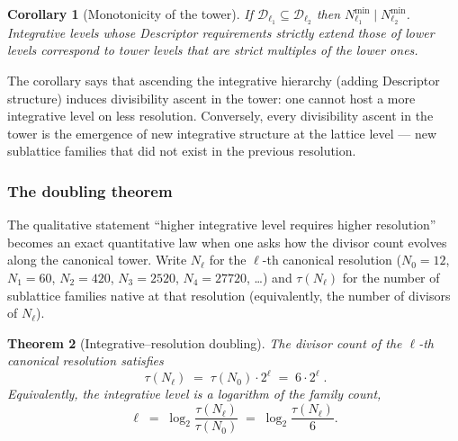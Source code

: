 \documentclass[11pt,a4paper]{article}
\newtheorem{theorem}{Theorem}[section]
\newtheorem{corollary}[theorem]{Corollary}
\theoremstyle{definition}
\theoremstyle{remark}
\begin{document}
\begin{corollary}[Monotonicity of the tower]\label{cor:int-monotone}
If $\mathcal{D}_{\ell_{1}}\subseteq\mathcal{D}_{\ell_{2}}$ then $N_{\ell_{1}}^{\min}\mid N_{\ell_{2}}^{\min}$. Integrative levels whose Descriptor requirements strictly extend those of lower levels correspond to tower levels that are strict multiples of the lower ones.
\end{corollary}

The corollary says that ascending the integrative hierarchy (adding Descriptor structure) induces divisibility ascent in the tower: one cannot host a more integrative level on less resolution. Conversely, every divisibility ascent in the tower is the emergence of new integrative structure at the lattice level --- new sublattice families that did not exist in the previous resolution.

\subsubsection*{The doubling theorem}

The qualitative statement ``higher integrative level requires higher resolution'' becomes an exact quantitative law when one asks how the divisor count evolves along the canonical tower. Write $N_{\ell}$ for the $\ell$-th canonical resolution ($N_{0}=12$, $N_{1}=60$, $N_{2}=420$, $N_{3}=2520$, $N_{4}=27720$, \ldots) and $\tau(N_{\ell})$ for the number of sublattice families native at that resolution (equivalently, the number of divisors of $N_{\ell}$).

\begin{theorem}[Integrative--resolution doubling]\label{thm:doubling}
The divisor count of the $\ell$-th canonical resolution satisfies
\begin{equation}\label{eq:doubling}
\boxed{\;\tau(N_{\ell}) \;=\; \tau(N_{0})\cdot 2^{\ell} \;=\; 6\cdot 2^{\ell}\;.}
\end{equation}
Equivalently, the integrative level is a logarithm of the family count,
\begin{equation}\label{eq:level-log}
\ell \;=\; \log_{2}\!\frac{\tau(N_{\ell})}{\tau(N_{0})} \;=\; \log_{2}\!\frac{\tau(N_{\ell})}{6}.
\end{equation}
\end{theorem}
\end{document}

